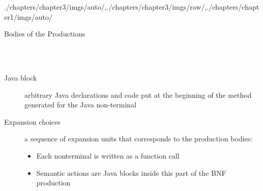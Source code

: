 \begin{graphicspathcontext}{{./chapters/chapter3/imgs/auto/},{./chapters/chapter3/imgs/raw/},{./chapters/chapter1/imgs/auto/}}
\begin{bibunit}[apalike]

\begin{frame}[t]{Bodies of the Productions}
	\begin{definition}\small
		 \\
		 \\
	\end{definition}
	\begin{description}
	\item[Java block] arbitrary Java declarations and code put at the beginning of the method generated for the Java non-terminal
	\item[Expansion choices] a sequence of expansion units that corresponds to the production bodies:
		\begin{itemize}
			\item Each nonterminal is written as a function call
			\item Semantic actions are Java blocks inside this part of the BNF production
		\end{itemize}
	\end{description}
\end{frame}


\end{bibunit}
\end{graphicspathcontext}
